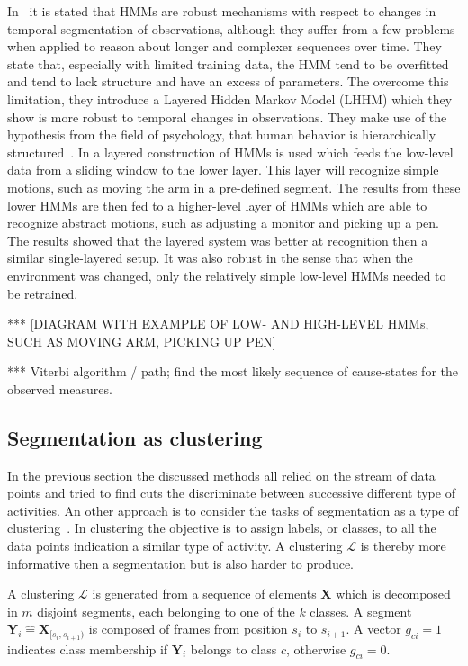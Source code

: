In~\cite{oliver2002layered} it is stated that HMMs are robust mechanisms with respect to changes in temporal segmentation of observations, although they suffer from a few problems when applied to reason about longer and complexer sequences over time.
They state that, especially with limited training data, the HMM tend to be overfitted and tend to lack structure and have an excess of parameters.
The overcome this limitation, they introduce a Layered Hidden Markov Model (LHHM) which they show is more robust to temporal changes in observations.
They make use of the hypothesis from the field of psychology, that human behavior is hierarchically structured~\cite{zacks2001event}.
In \cite{perdikis2008recognition} a layered construction of HMMs is used which feeds the low-level data from a sliding window to the lower layer.
This layer will recognize simple motions, such as moving the arm in a pre-defined segment.
The results from these lower HMMs are then fed to a higher-level layer of HMMs which are able to recognize abstract motions, such as adjusting a monitor and picking up a pen.
The results showed that the layered system was better at recognition then a similar single-layered setup.
It was also robust in the sense that when the environment was changed, only the relatively simple low-level HMMs needed to be retrained.

*** [DIAGRAM WITH EXAMPLE OF LOW- AND HIGH-LEVEL HMMs, SUCH AS MOVING ARM, PICKING UP PEN]


*** Viterbi algorithm / path; find the most likely sequence of cause-states for the observed measures.





\subsection{Segmentation as clustering}
In the previous section the discussed methods all relied on the stream of data points and tried to find cuts the discriminate between successive different type of activities.
An other approach is to consider the tasks of segmentation as a type of clustering~\cite{zhou2008aligned}.
In clustering the objective is to assign labels, or classes, to all the data points indication a similar type of activity.
A clustering $\mathcal{L}$ is thereby more informative then a segmentation but is also harder to produce.

A clustering $\mathcal{L}$ is generated from a sequence of elements $\mathbf{X}$ which is decomposed in $m$ disjoint segments, each belonging to one of the $k$ classes.
A segment $\mathbf{Y}_i \hat{=} \mathbf{X}_{[s_i,s_{i+1})}$ is composed of frames from position $s_i$ to $s_{i+1}$.
A vector $g_{ci} = 1$ indicates class membership if $\mathbf{Y}_i$ belongs to class $c$, otherwise $g_{ci} = 0$.

